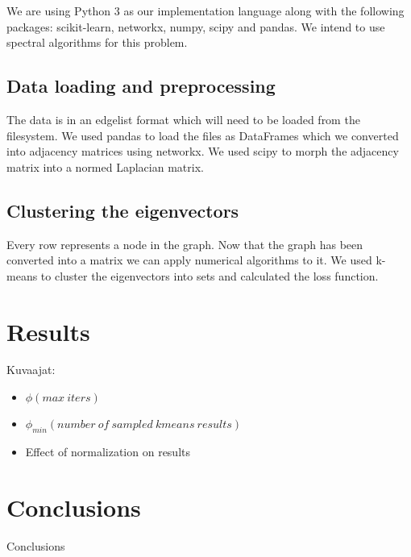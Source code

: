 \documentclass{article}
\begin{document}
We are using Python 3 as our implementation language along with the following packages: scikit-learn, networkx, numpy, scipy and pandas. We intend to use spectral algorithms for this problem.

\subsection{Data loading and preprocessing}

The data is in an edgelist format which will need to be loaded from the filesystem. We used pandas to load the files as DataFrames which we converted into adjacency matrices using networkx. We used scipy to morph the adjacency matrix into a normed Laplacian matrix.
	

\subsection{Clustering the eigenvectors}

Every row represents a node in the graph. Now that the graph has been converted into a matrix we can apply numerical algorithms to it. We used k-means to cluster the eigenvectors into sets and calculated the loss function.

\section{Results}
Kuvaajat: 
\begin{itemize}
	\item ${\phi(max\ iters)}$
	\item ${\phi_{min}(number\ of\ sampled\ kmeans\ results)}$
	\item Effect of normalization on results
\end{itemize}

\section{Conclusions}

Conclusions
\end{document}
